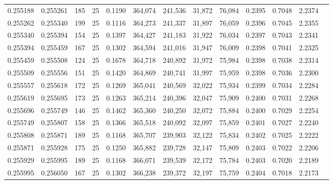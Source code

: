 \begin{tabular}{rrrrrrrrrrrrr}
0.255188 & 0.255261 &   185 &  25 &                                     0.1190 & 364,074 & 241,536 &  31,872 &  76,084 & 0.2395 & 0.7048 & 2.2374 \\
0.255262 & 0.255340 &   199 &  25 &                                     0.1116 & 364,273 & 241,337 &  31,897 &  76,059 & 0.2396 & 0.7045 & 2.2355 \\
0.255340 & 0.255394 &   154 &  25 &                                     0.1397 & 364,427 & 241,183 &  31,922 &  76,034 & 0.2397 & 0.7043 & 2.2341 \\
0.255394 & 0.255459 &   167 &  25 &                                     0.1302 & 364,594 & 241,016 &  31,947 &  76,009 & 0.2398 & 0.7041 & 2.2325 \\
0.255459 & 0.255508 &   124 &  25 &                                     0.1678 & 364,718 & 240,892 &  31,972 &  75,984 & 0.2398 & 0.7038 & 2.2314 \\
0.255509 & 0.255556 &   151 &  25 &                                     0.1420 & 364,869 & 240,741 &  31,997 &  75,959 & 0.2398 & 0.7036 & 2.2300 \\
0.255557 & 0.255618 &   172 &  25 &                                     0.1269 & 365,041 & 240,569 &  32,022 &  75,934 & 0.2399 & 0.7034 & 2.2284 \\
0.255619 & 0.255695 &   173 &  25 &                                     0.1263 & 365,214 & 240,396 &  32,047 &  75,909 & 0.2400 & 0.7031 & 2.2268 \\
0.255696 & 0.255749 &   146 &  25 &                                     0.1462 & 365,360 & 240,250 &  32,072 &  75,884 & 0.2400 & 0.7029 & 2.2254 \\
0.255749 & 0.255807 &   158 &  25 &                                     0.1366 & 365,518 & 240,092 &  32,097 &  75,859 & 0.2401 & 0.7027 & 2.2240 \\
0.255808 & 0.255871 &   189 &  25 &                                     0.1168 & 365,707 & 239,903 &  32,122 &  75,834 & 0.2402 & 0.7025 & 2.2222 \\
0.255871 & 0.255928 &   175 &  25 &                                     0.1250 & 365,882 & 239,728 &  32,147 &  75,809 & 0.2403 & 0.7022 & 2.2206 \\
0.255929 & 0.255995 &   189 &  25 &                                     0.1168 & 366,071 & 239,539 &  32,172 &  75,784 & 0.2403 & 0.7020 & 2.2189 \\
0.255995 & 0.256050 &   167 &  25 &                                     0.1302 & 366,238 & 239,372 &  32,197 &  75,759 & 0.2404 & 0.7018 & 2.2173 \\

\end{tabular}
